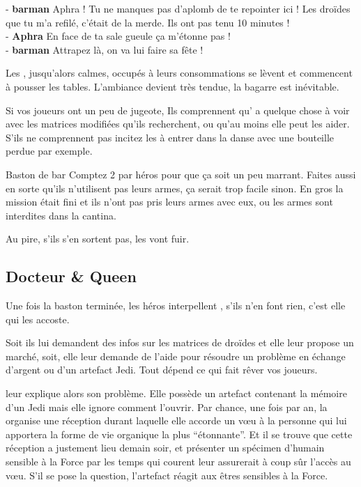 \begin{quotebox}
- \textbf{barman} Aphra ! Tu ne manques pas d’aplomb de te repointer ici ! Les droïdes que tu m’a refilé, c’était de la merde. Ils ont pas tenu 10 minutes !\\
- \textbf{Aphra} En face de ta sale gueule ça m’étonne pas !\\
- \textbf{barman} Attrapez là, on va lui faire sa fête !
\end{quotebox}

Les , jusqu’alors calmes, occupés à leurs consommations se lèvent et commencent à pousser les tables. L’ambiance devient très tendue, la bagarre est inévitable.

Si vos joueurs ont un peu de jugeote, Ils comprennent qu’ a quelque chose à voir avec les matrices modifiées qu’ils recherchent, ou qu’au moins elle peut les aider. S’ils ne comprennent pas incitez les à entrer dans la danse avec une bouteille perdue par exemple.

\begin{paperbox}{Baston de bar}
Comptez 2  par héros pour que ça soit un peu marrant. Faites aussi en sorte qu’ils n’utilisent pas leurs armes, ça serait trop facile sinon. En gros la mission était fini et ils n’ont pas pris leurs armes avec eux, ou les armes sont interdites dans la cantina.

Au pire, s’ils s’en sortent pas, les  vont fuir.
\end{paperbox}

\subsection{Docteur \& Queen}

Une fois la baston terminée, les héros interpellent , s’ils n’en font rien, c’est elle qui les accoste.

Soit ils lui demandent des infos sur les matrices de droïdes et elle leur propose un marché, soit, elle leur demande de l’aide pour résoudre un problème en échange d’argent ou d’un artefact Jedi. Tout dépend ce qui fait rêver vos joueurs.

 leur explique alors son problème. Elle possède un artefact contenant la mémoire d’un Jedi mais elle ignore comment l’ouvrir. Par chance, une fois par an, la  organise une réception durant laquelle elle accorde un vœu à la personne qui lui apportera la forme de vie organique la plus “étonnante”. Et il se trouve que cette réception a justement lieu demain soir, et présenter un spécimen d’humain sensible à la Force par les temps qui courent leur assurerait à coup sûr l’accès au vœu. S’il se pose la question, l’artefact réagit aux êtres sensibles à la Force.

